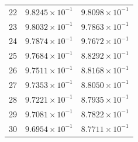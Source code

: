 \begin{table}[H]
\begin{tabular}{@{}rrr@{}}
22 & $9.8245\times10^{-1}$ & $9.8098\times10^{-1}$\\
23 & $9.8032\times10^{-1}$ & $9.7863\times10^{-1}$\\
24 & $9.7874\times10^{-1}$ & $9.7672\times10^{-1}$\\
25 & $9.7684\times10^{-1}$ & $8.8292\times10^{-1}$\\
26 & $9.7511\times10^{-1}$ & $8.8168\times10^{-1}$\\
27 & $9.7353\times10^{-1}$ & $8.8050\times10^{-1}$\\
28 & $9.7221\times10^{-1}$ & $8.7935\times10^{-1}$\\
29 & $9.7081\times10^{-1}$ & $8.7822\times10^{-1}$\\
30 & $9.6954\times10^{-1}$ & $8.7711\times10^{-1}$\\
\bottomrule
\end{tabular}
\end{table}

